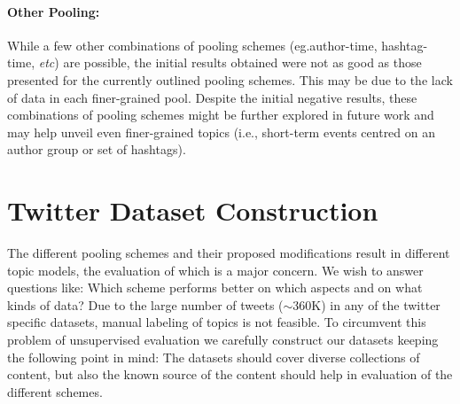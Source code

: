 \documentclass[10pt,a5paper,twoside]{article}
\begin{document}
\paragraph{Other Pooling:}

While a few other combinations of pooling schemes (eg.author-time,
hashtag-time, \textit{etc}) are possible, the initial results obtained
were not as good as those presented for the currently outlined
pooling schemes.  This may be due to the lack of data in each
finer-grained pool.  Despite the initial negative results, these 
combinations of pooling schemes might be further explored in future 
work and may help unveil even finer-grained topics (i.e., short-term 
events centred on an author group or set of hashtags).


\section{Twitter Dataset Construction}

\label{sec:dataset}

The different pooling schemes and their proposed modifications result
in different topic models, the evaluation of which is a major
concern. We wish to answer questions like: Which scheme performs
better on which aspects and on what kinds of data? Due to the large
number of tweets ($\sim$360K) in any of the twitter specific datasets,
manual labeling of topics is not feasible.  To circumvent this
problem of unsupervised evaluation we carefully construct our datasets
keeping the following point in mind: The datasets should cover diverse
collections of content, but also the known source of the content
should help in evaluation of the different schemes.
\end{document}
